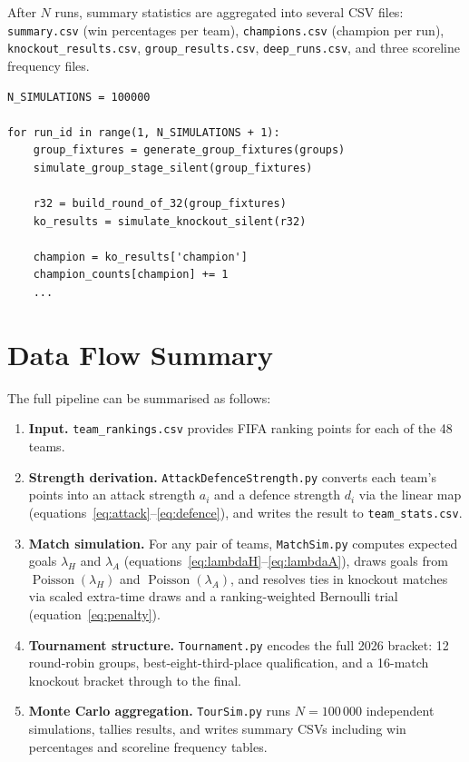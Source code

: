 \documentclass[12pt,a4paper]{article}
\newcommand{\Poi}{\operatorname{Poisson}}
\begin{document}
After $N$ runs, summary statistics are aggregated into several CSV files:
\texttt{summary.csv} (win percentages per team), \texttt{champions.csv}
(champion per run), \texttt{knockout\_results.csv},
\texttt{group\_results.csv}, \texttt{deep\_runs.csv}, and three
scoreline frequency files.

\begin{lstlisting}
N_SIMULATIONS = 100000

for run_id in range(1, N_SIMULATIONS + 1):
    group_fixtures = generate_group_fixtures(groups)
    simulate_group_stage_silent(group_fixtures)

    r32 = build_round_of_32(group_fixtures)
    ko_results = simulate_knockout_silent(r32)

    champion = ko_results['champion']
    champion_counts[champion] += 1
    ...
\end{lstlisting}

\section{Data Flow Summary}

The full pipeline can be summarised as follows:

\begin{enumerate}
  \item \textbf{Input.} \texttt{team\_rankings.csv} provides FIFA
        ranking points for each of the 48 teams.
  \item \textbf{Strength derivation.} \texttt{AttackDefenceStrength.py}
        converts each team's points into an attack strength $a_i$ and a
        defence strength $d_i$ via the linear map
        (equations~\ref{eq:attack}--\ref{eq:defence}), and writes the
        result to \texttt{team\_stats.csv}.
  \item \textbf{Match simulation.} For any pair of teams, \texttt{MatchSim.py}
        computes expected goals $\lambda_H$ and $\lambda_A$
        (equations~\ref{eq:lambdaH}--\ref{eq:lambdaA}), draws goals from
        $\Poi(\lambda_H)$ and $\Poi(\lambda_A)$, and resolves ties in
        knockout matches via scaled extra-time draws and a
        ranking-weighted Bernoulli trial (equation~\ref{eq:penalty}).
  \item \textbf{Tournament structure.} \texttt{Tournament.py} encodes the
        full 2026 bracket: 12 round-robin groups, best-eight-third-place
        qualification, and a 16-match knockout bracket through to the
        final.
  \item \textbf{Monte Carlo aggregation.} \texttt{TourSim.py} runs
        $N = 100\,000$ independent simulations, tallies results, and
        writes summary CSVs including win percentages and scoreline
        frequency tables.
\end{enumerate}
\end{document}
